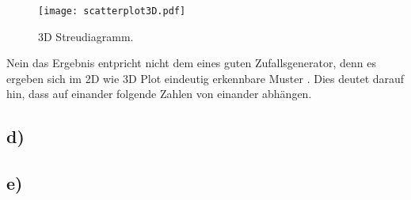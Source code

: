 \FloatBarrier
\begin{figure}
  \centering
  \texttt{[image: scatterplot3D.pdf]}
  \caption{3D Streudiagramm.}
  \label{fig:a2p5}
\end{figure}
\FloatBarrier
Nein das Ergebnis entpricht nicht dem eines guten Zufallsgenerator, denn es ergeben sich im 2D wie 3D Plot eindeutig
erkennbare Muster . Dies deutet darauf hin, dass auf einander folgende Zahlen von einander abhängen.

\subsection{d)}
\label{subsec:a2d}


\subsection{e)}
\label{subsec:a2e}
